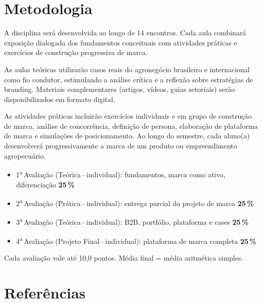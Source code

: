 \documentclass[11pt,a4paper]{article}
\begin{document}
\section*{Metodologia}

A disciplina será desenvolvida ao longo de 14 encontros. Cada aula combinará exposição dialogada dos fundamentos conceituais com atividades práticas e exercícios de construção progressiva de marca.

As aulas teóricas utilizarão casos reais do agronegócio brasileiro e internacional como fio condutor, estimulando a análise crítica e a reflexão sobre estratégias de branding. Materiais complementares (artigos, vídeos, guias setoriais) serão disponibilizados em formato digital.

As atividades práticas incluirão exercícios individuais e em grupo de construção de marca, análise de concorrência, definição de persona, elaboração de plataforma de marca e simulações de posicionamento. Ao longo do semestre, cada aluno(a) desenvolverá progressivamente a marca de um produto ou empreendimento agropecuário.


\begin{tcolorbox}[uefsbox, colframe=uefsaccent, colback=white, title={\bfseries\color{white}\scshape Avaliação}, fonttitle=\normalsize, coltitle=white, colbacktitle=uefsaccent, attach boxed title to top left={yshift=-2mm,xshift=2mm}, boxed title style={arc=2pt,boxrule=0pt}]
\begin{itemize}[leftmargin=1.2em]
\item 1\textsuperscript{a}\,Avaliação (Teórica\,--\,individual): fundamentos, marca como ativo, diferenciação\,\dotfill\,\textbf{25\,\%}
\item 2\textsuperscript{a}\,Avaliação (Prática\,--\,individual): entrega parcial do projeto de marca\,\dotfill\,\textbf{25\,\%}
\item 3\textsuperscript{a}\,Avaliação (Teórica\,--\,individual): B2B, portfólio, plataforma e cases\,\dotfill\,\textbf{25\,\%}
\item 4\textsuperscript{a}\,Avaliação (Projeto Final\,--\,individual): plataforma de marca completa\,\dotfill\,\textbf{25\,\%}
\end{itemize}
\vspace{4pt}
{\footnotesize Cada avaliação vale até 10,0 pontos. Média final = média aritmética simples.}
\end{tcolorbox}



\section*{Referências}
\end{document}
